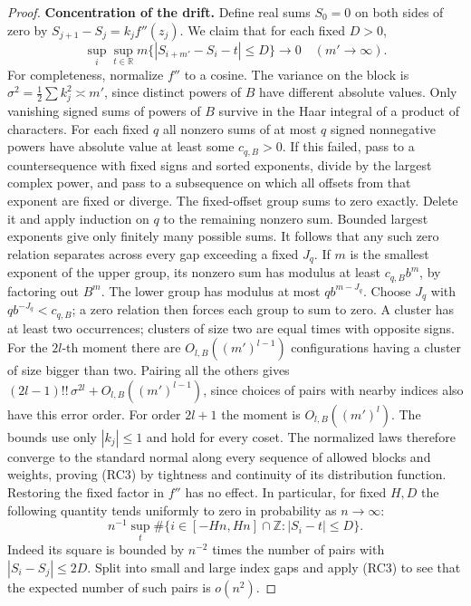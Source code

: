 \documentclass[11pt,a4paper]{article}
\begin{document}
\begin{proof}
\par\smallskip\noindent\textbf{Concentration of the drift.}\enspace
Define real sums $S_0=0$ on both sides of zero by
$S_{j+1}-S_j=k_j f''(z_j)$. We claim that for each fixed $D>0$,
\begin{equation}
 \sup_i\sup_{t\in\mathbb R}m\{|S_{i+m'}-S_i-t|\le D\}\to0
       \quad(m'\to\infty). \tag{RC3}
\end{equation}
For completeness, normalize $f''$ to a cosine. The variance on the
block is $\sigma^2=\frac12\sum k_j^2\asymp m'$, since distinct powers
of $B$ have different absolute values. Only vanishing signed sums of
powers of $B$ survive in the Haar integral of a product of characters.
For each fixed $q$ all nonzero sums of at most $q$ signed nonnegative
powers have absolute value at least some $c_{q,B}>0$. If this failed,
pass to a countersequence with fixed signs and sorted exponents, divide
by the largest complex power, and pass to a subsequence on which all
offsets from that exponent are fixed or diverge. The fixed-offset group
sums to zero exactly. Delete it and apply induction on $q$ to the
remaining nonzero sum. Bounded largest exponents give only finitely many
possible sums. It follows that any such zero relation separates across
every gap exceeding a fixed $J_q$. If $m$ is the smallest exponent of the upper group, its nonzero sum has modulus at least $c_{q,B}b^m$, by factoring out $B^m$. The lower group has modulus at most $q b^{m-J_q}$. Choose $J_q$ with $qb^{-J_q}<c_{q,B}$; a zero relation then forces each group to sum to zero. A cluster has at least two occurrences; clusters of size two
are equal times with opposite signs. For the $2l$-th moment there are
$O_{l,B}((m')^{l-1})$ configurations having a cluster of size bigger
than two. Pairing all the others gives
$(2l-1)!!\,\sigma^{2l}+O_{l,B}((m')^{l-1})$, since choices of pairs
with nearby indices also have this error order. For order $2l+1$ the
moment is $O_{l,B}((m')^l)$. The bounds use only $|k_j|\le1$ and hold
for every coset. The normalized laws therefore converge to the standard
normal along every sequence of allowed blocks and weights, proving
(RC3) by tightness and continuity of its distribution function.
Restoring the fixed factor in $f''$ has no effect. In particular,
for fixed $H,D$ the following quantity tends uniformly to zero in
probability as $n\to\infty$:
\[
 n^{-1}\sup_t\#\{i\in[-Hn,Hn]\cap\mathbb Z:|S_i-t|\le D\}.
\]
Indeed its square is bounded by $n^{-2}$ times the number of pairs with
$|S_i-S_j|\le2D$. Split into small and large index gaps and apply (RC3)
to see that the expected number of such pairs is $o(n^2)$.


\end{proof}
\end{document}
